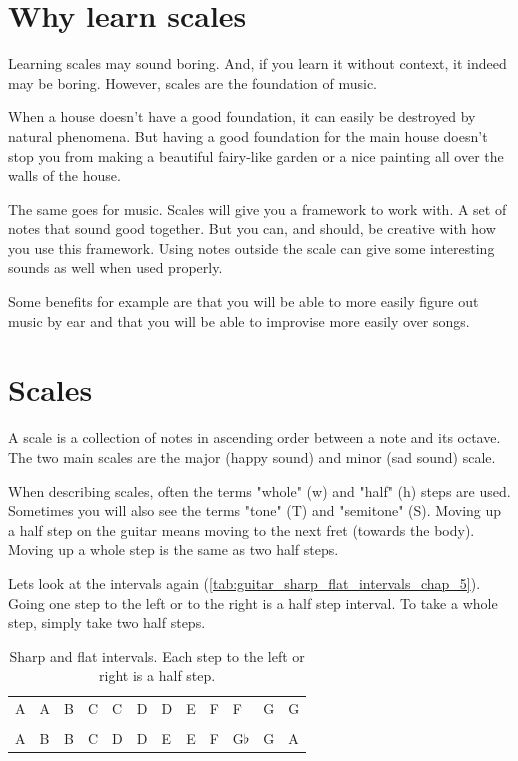 \section{Why learn scales}

Learning scales may sound boring. And, if you learn it without context, it indeed may be boring. However, scales are the foundation of music.

When a house doesn't have a good foundation, it can easily be destroyed by natural phenomena. But having a good foundation for the main house doesn't stop you from making a beautiful fairy-like garden or a nice painting all over the walls of the house.

The same goes for music. Scales will give you a framework to work with. A set of notes that sound good together. But you can, and should, be creative with how you use this framework. Using notes outside the scale can give some interesting sounds as well when used properly.

Some benefits for example are that you will be able to more easily figure out music by ear and that you will be able to improvise more easily over songs. 

\section{Scales}

A scale is a collection of notes in ascending order between a note and its octave. The two main scales are the major (happy sound) and minor (sad sound) scale.

When describing scales, often the terms "whole" (w) and "half" (h) steps are used. Sometimes you will also see the terms "tone" (T) and "semitone" (S). Moving up a half step on the guitar means moving to the next fret (towards the body). Moving up a whole step is the same as two half steps.

Lets look at the intervals again (\autoref{tab:guitar_sharp_flat_intervals_chap_5}). Going one step to the left or to the right is a half step interval. To take a whole step, simply take two half steps.

\begin{table}[h]
	\centering
	\begin{tabular}{*{12}{P{5mm}}}
		\large{A} & \large{A\sharp} & \large{B} & \large{C} & \large{C\sharp} & \large{D} & \large{D\sharp} & \large{E} & \large{F} & \large{F\sharp} & \large{G} & \large{G\sharp} \\ \\
		\large{A} & \large{B\flat} & \large{B} & \large{C} & \large{D\flat} & \large{D} & \large{E\flat} & \large{E} & \large{F} & \large{G$\flat$}& \large{G} & \large{A\flat}
	\end{tabular}
	\caption{Sharp and flat intervals. Each step to the left or right is a half step.}
	\label{tab:guitar_sharp_flat_intervals_chap_5}
\end{table}

